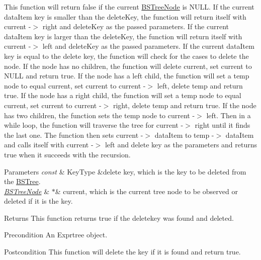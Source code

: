 This function will return false if the current \hyperlink{class_b_s_tree_1_1_b_s_tree_node}{B\+S\+Tree\+Node} is N\+U\+LL. If the current data\+Item key is smaller than the delete\+Key, the function will return itself with current -\/$>$ right and delete\+Key as the passed parameters. If the current data\+Item key is larger than the delete\+Key, the function will return itself with current -\/$>$ left and delete\+Key as the passed parameters. If the current data\+Item key is equal to the delete key, the function will check for the cases to delete the node. If the node has no children, the function will delete current, set current to N\+U\+LL and return true. If the node has a left child, the function will set a temp node to equal current, set current to current -\/$>$ left, delete temp and return true. If the node has a right child, the function will set a temp node to equal current, set current to current -\/$>$ right, delete temp and return true. If the node has two children, the function sets the temp node to current -\/$>$ left. Then in a while loop, the function will traverse the tree for current -\/$>$ right until it finds the last one. The function then sets current -\/$>$ data\+Item to temp -\/$>$ data\+Item and calls itself with current -\/$>$ left and delete key as the parameters and returns true when it succeeds with the recursion.


\begin{DoxyParams}{Parameters}
{\em const} & Key\+Type \&delete key, which is the key to be deleted from the \hyperlink{class_b_s_tree}{B\+S\+Tree}. \\
\hline
{\em \hyperlink{class_b_s_tree_1_1_b_s_tree_node}{B\+S\+Tree\+Node}} & $\ast$\& current, which is the current tree node to be observed or deleted if it is the key. \\
\hline
\end{DoxyParams}
\begin{DoxyReturn}{Returns}
This function returns true if the deletekey was found and deleted.
\end{DoxyReturn}
\begin{DoxyPrecond}{Precondition}
An Exprtree object. 
\end{DoxyPrecond}
\begin{DoxyPostcond}{Postcondition}
This function will delete the key if it is found and return true. 
\end{DoxyPostcond}
